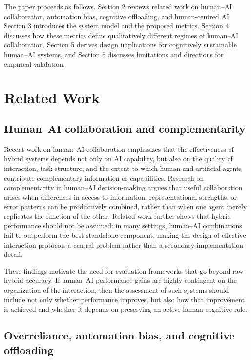 \documentclass[11pt]{article}
\begin{document}
The paper proceeds as follows. Section 2 reviews related work on
human--AI collaboration, automation bias, cognitive offloading, and
human-centred AI. Section 3 introduces the system model and the proposed
metrics. Section 4 discusses how these metrics define qualitatively
different regimes of human--AI collaboration. Section 5 derives design
implications for cognitively sustainable human--AI systems, and
Section 6 discusses limitations and directions for empirical validation.


\section{Related Work}

\subsection{Human--AI collaboration and complementarity}

Recent work on human--AI collaboration emphasizes that the effectiveness
of hybrid systems depends not only on AI capability, but also on the
quality of interaction, task structure, and the extent to which human
and artificial agents contribute complementary information or capabilities.
Research on complementarity in human--AI decision-making argues that
useful collaboration arises when differences in access to information,
representational strengths, or error patterns can be productively combined,
rather than when one agent merely replicates the function of the other.
Related work further shows that hybrid performance should not be assumed:
in many settings, human--AI combinations fail to outperform the best
standalone component, making the design of effective interaction protocols
a central problem rather than a secondary implementation detail.

These findings motivate the need for evaluation frameworks that go beyond
raw hybrid accuracy. If human--AI performance gains are highly contingent
on the organization of the interaction, then the assessment of such systems
should include not only whether performance improves, but also how that
improvement is achieved and whether it depends on preserving an active
human cognitive role.

\subsection{Overreliance, automation bias, and cognitive offloading}
\end{document}
